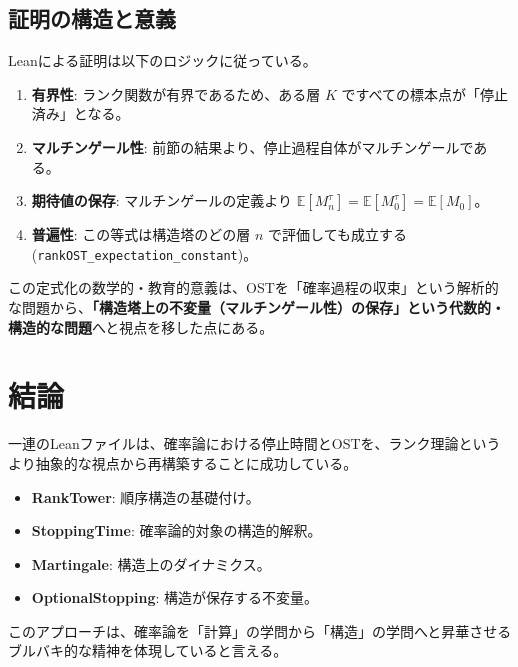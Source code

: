 \documentclass[a4paper,11pt]{ltjsarticle}
\theoremstyle{definition}
\newcommand{\Expect}{\mathbb{E}}
\newcommand{\Tau}{\tau}
\begin{document}
\subsection{証明の構造と意義}
Leanによる証明は以下のロジックに従っている。

\begin{enumerate}
    \item \textbf{有界性}: ランク関数が有界であるため、ある層 $K$ ですべての標本点が「停止済み」となる。
    \item \textbf{マルチンゲール性}: 前節の結果より、停止過程自体がマルチンゲールである。
    \item \textbf{期待値の保存}: マルチンゲールの定義より $\Expect[M^\Tau_n] = \Expect[M^\Tau_0] = \Expect[M_0]$。
    \item \textbf{普遍性}: この等式は構造塔のどの層 $n$ で評価しても成立する (\texttt{rankOST\_expectation\_constant})。
\end{enumerate}

この定式化の数学的・教育的意義は、OSTを「確率過程の収束」という解析的な問題から、\textbf{「構造塔上の不変量（マルチンゲール性）の保存」という代数的・構造的な問題}へと視点を移した点にある。

\section{結論}
一連のLeanファイルは、確率論における停止時間とOSTを、ランク理論というより抽象的な視点から再構築することに成功している。
\begin{itemize}
    \item \textbf{RankTower}: 順序構造の基礎付け。
    \item \textbf{StoppingTime}: 確率論的対象の構造的解釈。
    \item \textbf{Martingale}: 構造上のダイナミクス。
    \item \textbf{OptionalStopping}: 構造が保存する不変量。
\end{itemize}
このアプローチは、確率論を「計算」の学問から「構造」の学問へと昇華させるブルバキ的な精神を体現していると言える。
\end{document}
